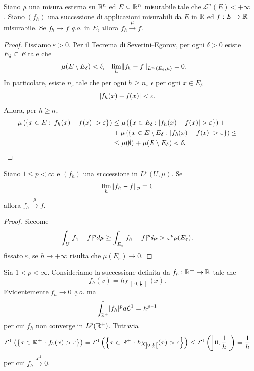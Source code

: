 \begin{proposizione}
	Siano $\mu$ una misura esterna su $\mathbb{R}^n$ ed $E \subseteq \mathbb{R}^n$ misurabile tale che $\mathcal{L}^n(E)<+\infty$. Siano $(f_{h})$ una successione di applicazioni misurabili da $E$ in $\mathbb{R}$ ed $f: E \to \mathbb{R}$ misurabile. Se $f_h \to f$ \emph{q.o.} in $E$, allora $f_h \overset{\mu}{\to} f$.
\end{proposizione}
\begin{proof}
Fissiamo $\varepsilon >0$. Per il Teorema di Severini--Egorov, per ogni $\delta >0$ esiste $E_{\delta}\subseteq E$ tale che 
\begin{align*}
	\mu(E\setminus E_{\delta})&<\delta,  & \lim_{h}\lVert f_{h}-f\rVert_{L^{\infty}(E_{\delta},\mu)} &=0.
\end{align*} 
In particolare, esiste $n_\varepsilon$ tale che per ogni $h \ge n_\varepsilon$ e per ogni $x \in E_\delta$
\[ \lvert f_h(x)-f(x)\rvert< \varepsilon. \]
Allora, per $h \ge n_\varepsilon$
\begin{align*}
 \mu\left( \left\lbrace x \in E: \lvert f_h(x)-f(x)\rvert>\varepsilon\right\rbrace \right) &\le \mu\left( \left\lbrace x \in E_\delta: \lvert f_h(x)-f(x)\rvert>\varepsilon \right\rbrace \right) + \\
 &+\mu\left( \left\lbrace x \in E\setminus E_\delta: \lvert f_h(x)-f(x)\rvert>\varepsilon \right\rbrace \right) \le \\
 &\le \mu(\emptyset) + \mu(E \setminus E_\delta) < \delta.\qedhere
\end{align*}
\end{proof}

\begin{proposizione}
Siano $1\le p < \infty$ e $(f_h)$ una successione in $L^p(U,\mu)$. Se 
\[ \lim_{h}\lVert f_h-f\rVert_{p} = 0 \]
allora $f_h \overset{\mu}{\to} f$.
\end{proposizione}
\begin{proof}
Siccome
	\[ \int_{U} \lvert f_h - f\rvert^p d\mu \ge \int_{E_{\varepsilon}}\lvert f_h - f\rvert^p d\mu > \varepsilon^p\mu(E_{\varepsilon}),\]
fissato $\varepsilon$, se $h \to +\infty$ risulta che $\mu(E_{\varepsilon}) \to 0$.
\end{proof}
\begin{esempio}
Sia $1<p<\infty$. Consideriamo la successione definita da $f_h: \mathbb{R}^+ \to \mathbb{R}$ tale che
\[ f_h(x) = h\chi_{\left] 0,\frac{1}{h}\right[ }(x). \]
Evidentemente $f_h \to 0$ \emph{q.o.} ma
\[ \int_{\mathbb{R}^+}\lvert f_h\rvert^pd\mathcal{L}^1 = h^{p-1} \]
per cui $f_h$ non converge in $L^p(\mathbb{R}^+)$. Tuttavia
\[ \mathcal{L}^1 \left( \left\lbrace x \in \mathbb{R}^+: f_h(x) > \varepsilon\right\rbrace \right)  = \mathcal{L}^1\left( \left\lbrace x \in \mathbb{R}^+: h\chi_{\left] 0,\frac{1}{h}\right[ }(x) > \varepsilon\right\rbrace \right)  \le \mathcal{L}^1\left( \left] 0,\frac{1}{h}\right[\right) = \frac{1}{h}\]
per cui  $f_h \overset{\mathcal{L}^1}{\to} 0$.
\end{esempio}

